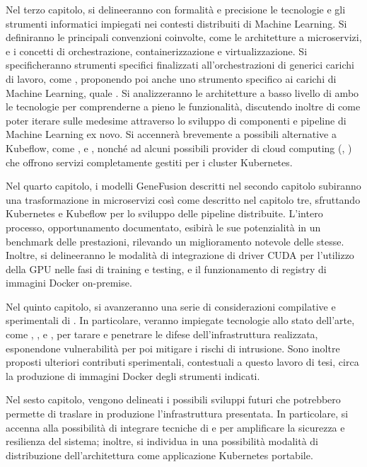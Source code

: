 Nel terzo capitolo, si delineeranno con formalità e precisione le tecnologie e gli strumenti informatici impiegati nei contesti distribuiti di Machine Learning. Si definiranno le principali convenzioni coinvolte, come le architetture a microservizi, e i concetti di orchestrazione, containerizzazione e virtualizzazione. Si specificheranno strumenti specifici finalizzati all'orchestrazioni di generici carichi di lavoro, come , proponendo poi anche uno strumento specifico ai carichi di Machine Learning, quale . Si analizzeranno le architetture a basso livello di ambo le tecnologie per comprenderne a pieno le funzionalità, discutendo inoltre di come poter iterare sulle medesime attraverso lo sviluppo di componenti e pipeline di Machine Learning ex novo. Si accennerà brevemente a possibili alternative a Kubeflow, come ,  e , nonché ad alcuni possibili provider di cloud computing (, ) che offrono servizi completamente gestiti per i cluster Kubernetes.

Nel quarto capitolo, i modelli GeneFusion descritti nel secondo capitolo subiranno una trasformazione in microservizi così come descritto nel capitolo tre, sfruttando Kubernetes e Kubeflow per lo sviluppo delle pipeline distribuite. L'intero processo, opportunamento documentato, esibirà le sue potenzialità in un benchmark delle prestazioni, rilevando un miglioramento notevole delle stesse. Inoltre, si delineeranno le modalità di integrazione di driver CUDA per l'utilizzo della GPU nelle fasi di training e testing, e il funzionamento di registry di immagini Docker on-premise.

Nel quinto capitolo, si avanzeranno una serie di considerazioni compilative e sperimentali di . In particolare, veranno impiegate tecnologie allo stato dell'arte, come , ,  e , per tarare e penetrare le difese dell'infrastruttura realizzata, esponendone vulnerabilità per poi mitigare i rischi di intrusione. Sono inoltre proposti ulteriori contributi sperimentali, contestuali a questo lavoro di tesi, circa la produzione di immagini Docker degli strumenti indicati. 

Nel sesto capitolo, vengono delineati i possibili sviluppi futuri che potrebbero permette di traslare in produzione l'infrastruttura presentata. In particolare, si accenna alla possibilità di integrare tecniche di  e  per amplificare la sicurezza e resilienza del sistema; inoltre, si individua in  una possibilità modalità di distribuzione dell'architettura come applicazione Kubernetes portabile.

